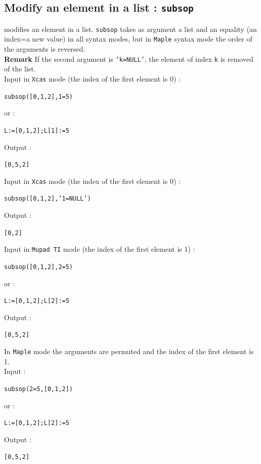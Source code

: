 \documentclass[a4paper,11pt]{book}
\begin{document}
\subsection{Modify an element in a list : {\tt subsop}}
 modifies an element in a list.
{\tt subsop} takes as argument a list and an equality (an index=a new
value) in all syntax modes, but in {\tt Maple} syntax mode
the order of the arguments is reversed. \\ 
{\bf Remark} If the second argument is {\tt 'k=NULL'}, the element of index 
{\tt k} is removed of the list.\\
Input in {\tt Xcas} mode (the index of the first element is 0) :
\begin{center}{\tt subsop([0,1,2],1=5)}\end{center}
or :
\begin{center}{\tt L:=[0,1,2];L[1]:=5}\end{center}
Output :
\begin{center}{\tt [0,5,2]}\end{center}
Input in {\tt Xcas} mode (the index of the first element is 0) :
\begin{center}{\tt subsop([0,1,2],'1=NULL')}\end{center}
Output :
\begin{center}{\tt [0,2]}\end{center}

Input in {\tt Mupad TI} mode  (the index of the first element is 1) :
\begin{center}{\tt subsop([0,1,2],2=5)}\end{center}
or :
\begin{center}{\tt L:=[0,1,2];L[2]:=5}\end{center}
Output :
\begin{center}{\tt [0,5,2]}\end{center}
In {\tt Maple} mode the arguments are permuted and  the index of
the first element is 1.\\
Input :
\begin{center}{\tt subsop(2=5,[0,1,2])}\end{center}
or :
\begin{center}{\tt L:=[0,1,2];L[2]:=5}\end{center}
Output :
\begin{center}{\tt [0,5,2]}\end{center}
\end{document}
